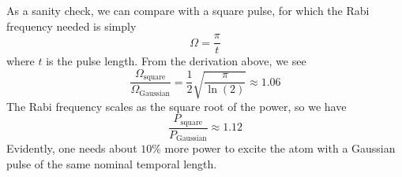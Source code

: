 As a sanity check, we can compare with a square pulse, for which the Rabi frequency needed is simply
\begin{equation}
    \Omega = \frac{\pi}{t}
\end{equation}
where $t$ is the pulse length. From the derivation above, we see \begin{equation}
    \frac{\Omega_{\textrm{square}}}{\Omega_{\textrm{Gaussian}}}=\frac{1}{2}\sqrt{\frac{\pi}{\ln(2)}} \approx 1.06
\end{equation}
The Rabi frequency scales as the square root of the power, so we have
\begin{equation}
\frac{P_{\textrm{square}}}{P_{\textrm{Gaussian}}} \approx 1.12
\end{equation}
Evidently, one needs about $10\%$ more power to excite the atom with a Gaussian pulse of the same nominal temporal length.

